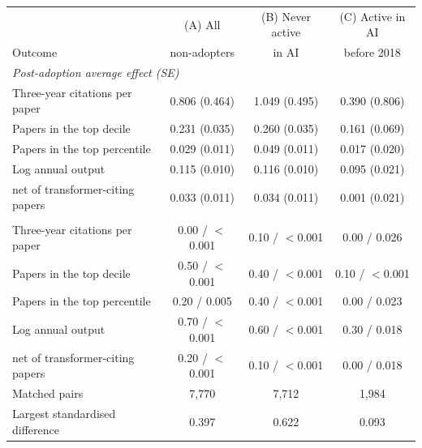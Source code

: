 \begin{tabular}{lccc}
\toprule
 & (A) All & (B) Never active & (C) Active in AI \\
Outcome & non-adopters & in AI & before 2018 \\
\midrule
\multicolumn{4}{l}{\emph{Post-adoption average effect (SE)}} \\
Three-year citations per paper & 0.806 (0.464) & 1.049 (0.495) & 0.390 (0.806) \\
Papers in the top decile & 0.231 (0.035) & 0.260 (0.035) & 0.161 (0.069) \\
Papers in the top percentile & 0.029 (0.011) & 0.049 (0.011) & 0.017 (0.020) \\
Log annual output & 0.115 (0.010) & 0.116 (0.010) & 0.095 (0.021) \\
\;\;net of transformer-citing papers & 0.033 (0.011) & 0.034 (0.011) & 0.001 (0.021) \\
\addlinespace
\multicolumn{4}{l}{\emph{Breakdown value $\bar{M}$ / joint placebo test $p$}} \\
Three-year citations per paper & 0.00 / $<$0.001 & 0.10 / $<$0.001 & 0.00 / 0.026 \\
Papers in the top decile & 0.50 / $<$0.001 & 0.40 / $<$0.001 & 0.10 / $<$0.001 \\
Papers in the top percentile & 0.20 / 0.005 & 0.40 / $<$0.001 & 0.00 / 0.023 \\
Log annual output & 0.70 / $<$0.001 & 0.60 / $<$0.001 & 0.30 / 0.018 \\
\;\;net of transformer-citing papers & 0.20 / $<$0.001 & 0.10 / $<$0.001 & 0.00 / 0.018 \\
\midrule
Matched pairs & 7,770 & 7,712 & 1,984 \\
Largest standardised difference & 0.397 & 0.622 & 0.093 \\
\bottomrule
\end{tabular}
